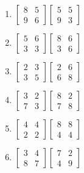 \documentclass[20pt]{extarticle}
\begin{document}
\begin{minipage}{0.7\linewidth}
\begin{multicols}{3}
\begin{enumerate}
                \item \(\begin{bmatrix}
                        8 & 5\\
                        9 & 6
                    \end{bmatrix}\begin{bmatrix}
                        5 & 5\\
                        9 & 3
                    \end{bmatrix}\)
                \item \(\begin{bmatrix}
                        5 & 6\\
                        3 & 3
                    \end{bmatrix}\begin{bmatrix}
                        8 & 6\\
                        3 & 6
                    \end{bmatrix}\)
                \item \(\begin{bmatrix}
                        2 & 3\\
                        3 & 5
                    \end{bmatrix}\begin{bmatrix}
                        2 & 6\\
                        6 & 8
                    \end{bmatrix}\)
                \item \(\begin{bmatrix}
                        3 & 2\\
                        7 & 3
                    \end{bmatrix}\begin{bmatrix}
                        8 & 2\\
                        7 & 8
                    \end{bmatrix}\)
                \item \(\begin{bmatrix}
                        4 & 4\\
                        2 & 2
                    \end{bmatrix}\begin{bmatrix}
                        8 & 8\\
                        4 & 4
                    \end{bmatrix}\)
                \item \(\begin{bmatrix}
                        3 & 4\\
                        8 & 7
                    \end{bmatrix}\begin{bmatrix}
                        7 & 2\\
                        4 & 9
                    \end{bmatrix}\)
    

\end{enumerate}
\end{multicols}
\end{minipage}
\end{document}
